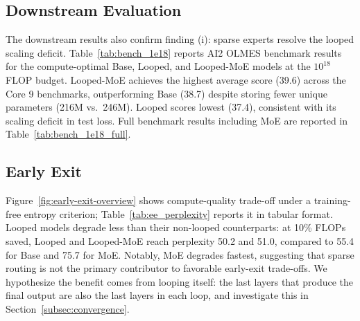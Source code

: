 \documentclass{article}
\begin{document}
\subsection{Downstream Evaluation}
The downstream results also confirm finding (i): sparse experts resolve the looped scaling deficit. Table~\ref{tab:bench_1e18} reports AI2 OLMES benchmark results for the compute-optimal Base, Looped, and Looped-MoE models at the $10^{18}$ FLOP budget. Looped-MoE achieves the highest average score (39.6) across the Core 9 benchmarks, outperforming Base (38.7) despite storing fewer unique parameters (216M vs.\ 246M). Looped  scores lowest (37.4), consistent with its scaling deficit in test loss. Full benchmark results including MoE are reported in Table~\ref{tab:bench_1e18_full}.


\begin{table}[t]
  \centering
  \caption{AI2 OLMES benchmark results for compute-optimal models at $10^{18}$ FLOPs. Looped-MoE achieves the highest average score with fewer stored parameters than Base.}
  \label{tab:bench_1e18}
\end{table}

\subsection{Early Exit}
Figure~\ref{fig:early-exit-overview} shows compute-quality trade-off under a training-free entropy criterion; Table~\ref{tab:ee_perplexity} reports it in tabular format. Looped models degrade less than their non-looped counterparts: at 10\% FLOPs saved, Looped and Looped-MoE reach perplexity 50.2 and 51.0, compared to 55.4 for Base and 75.7 for MoE. Notably, MoE degrades fastest, suggesting that sparse routing is not the primary contributor to favorable early-exit trade-offs. We hypothesize the benefit comes from looping itself: the last layers that produce the final output are also the last layers in each loop, and investigate this in Section~\ref{subsec:convergence}.
\end{document}
